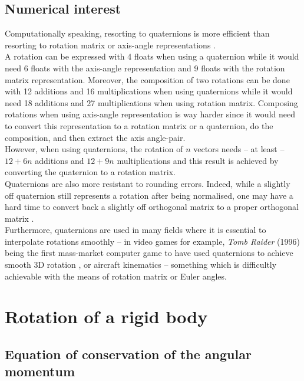 \documentclass[class=report, float=false, crop=false]{standalone}
\begin{document}
\subsection{Numerical interest}
\label{quaternions_interest}

Computationally speaking, resorting to quaternions is more efficient than resorting to rotation matrix or axis-angle representations \cite{eberly2002rotation}.\\

A rotation can be expressed with 4 floats when using a quaternion while it would need 6 floats with the axis-angle representation and 9 floats with the rotation matrix representation. Moreover, the composition of two rotations can be done with 12 additions and 16 multiplications when using quaternions while it would need 18 additions and 27 multiplications when using rotation matrix. Composing rotations when using axis-angle representation is way harder since it would need to convert this representation to a rotation matrix or a quaternion, do the composition, and then extract the axis angle-pair.\\

However, when using quaternions, the rotation of $n$ vectors needs -- at least \cite{eberly2002rotation} -- $12 + 6n$ additions and $12 + 9n$ multiplications and this result is achieved by converting the quaternion to a rotation matrix.\\

Quaternions are also more resistant to rounding errors. Indeed, while a slightly off quaternion still represents a rotation after being normalised, one may have a hard time to convert back a slightly off orthogonal matrix to a proper orthogonal matrix \cite{wiki:quaternions}.\\

Furthermore, quaternions are used in many fields where it is essential to interpolate rotations smoothly -- in video games for example, \textit{Tomb Raider} (1996) being the first mass-market computer game to have used quaternions to achieve smooth 3D rotation \cite{bobick1998rotating}, or aircraft kinematics \cite{phillips2001review} -- something which is difficultly achievable with the means of rotation matrix or Euler angles.

\section{Rotation of a rigid body}

\subsection{Equation of conservation of the angular momentum}
\end{document}
